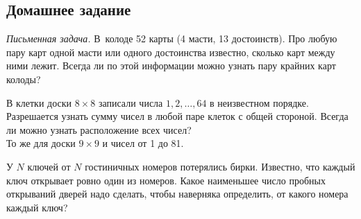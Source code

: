 

\subsection*{Домашнее задание}



\begin{problems}

\item\emph{Письменная задача.}
В~колоде 52 карты (4 масти, 13 достоинств).
Про любую пару карт одной масти или одного достоинства известно, сколько карт
между ними лежит.
Всегда ли по этой информации можно узнать пару крайних карт колоды?

\item
\subproblem
В клетки доски $8 \times 8$ записали числа $1, 2, \ldots, 64$ в неизвестном
порядке.
Разрешается узнать сумму чисел в любой паре клеток с общей стороной.
Всегда ли можно узнать расположение всех чисел?
\\
\subproblem
То же для доски $9 \times 9$ и чисел от 1 до 81.

\item
У $N$ ключей от $N$ гостиничных номеров потерялись бирки.
Известно, что каждый ключ открывает ровно один из номеров.
Какое наименьшее число пробных открываний дверей надо сделать, чтобы наверняка
определить, от какого номера каждый ключ?

\end{problems}

